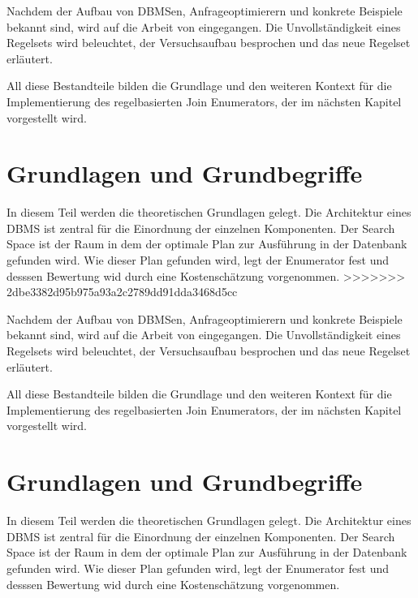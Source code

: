 Nachdem der Aufbau von DBMSen, Anfrageoptimierern und konkrete Beispiele bekannt sind, wird auf die Arbeit von \cite{indien} eingegangen. Die Unvollständigkeit eines Regelsets wird beleuchtet, der Versuchsaufbau besprochen und das neue Regelset erläutert.

All diese Bestandteile bilden die Grundlage und den weiteren Kontext für die Implementierung des regelbasierten Join Enumerators, der im nächsten Kapitel vorgestellt wird.






\section{Grundlagen und Grundbegriffe}

In diesem Teil werden die theoretischen Grundlagen gelegt. Die Architektur eines DBMS ist zentral für die Einordnung der einzelnen Komponenten. Der Search Space ist der Raum in dem der optimale Plan zur Ausführung in der Datenbank gefunden wird. Wie dieser Plan gefunden wird, legt der Enumerator fest und desssen Bewertung wid durch eine Kostenschätzung vorgenommen.
>>>>>>> 2dbe3382d95b975a93a2c2789dd91dda3468d5cc

Nachdem der Aufbau von DBMSen, Anfrageoptimierern und konkrete Beispiele bekannt sind, wird auf die Arbeit von \cite{shanbhag2014optimizing} eingegangen. Die Unvollständigkeit eines Regelsets wird beleuchtet, der Versuchsaufbau besprochen und das neue Regelset erläutert.

All diese Bestandteile bilden die Grundlage und den weiteren Kontext für die Implementierung des regelbasierten Join Enumerators, der im nächsten Kapitel vorgestellt wird.






\section{Grundlagen und Grundbegriffe}

In diesem Teil werden die theoretischen Grundlagen gelegt. Die Architektur eines DBMS ist zentral für die Einordnung der einzelnen Komponenten. Der Search Space ist der Raum in dem der optimale Plan zur Ausführung in der Datenbank gefunden wird. Wie dieser Plan gefunden wird, legt der Enumerator fest und desssen Bewertung wid durch eine Kostenschätzung vorgenommen.




















